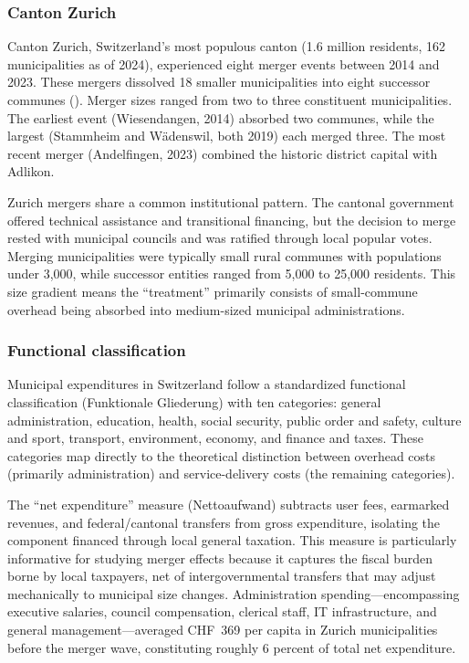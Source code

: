 \documentclass[12pt]{article}
\begin{document}
\subsubsection*{Canton Zurich} Canton Zurich, Switzerland's most populous canton (1.6 million residents, 162 municipalities as of 2024), experienced eight merger events between 2014 and 2023. These mergers dissolved 18 smaller municipalities into eight successor communes (). Merger sizes ranged from two to three constituent municipalities. The earliest event (Wiesendangen, 2014) absorbed two communes, while the largest (Stammheim and Wädenswil, both 2019) each merged three. The most recent merger (Andelfingen, 2023) combined the historic district capital with Adlikon.

Zurich mergers share a common institutional pattern. The cantonal government offered technical assistance and transitional financing, but the decision to merge rested with municipal councils and was ratified through local popular votes. Merging municipalities were typically small rural communes with populations under 3,000, while successor entities ranged from 5,000 to 25,000 residents. This size gradient means the ``treatment'' primarily consists of small-commune overhead being absorbed into medium-sized municipal administrations.

\subsubsection*{Functional classification} Municipal expenditures in Switzerland follow a standardized functional classification (Funktionale Gliederung) with ten categories: general administration, education, health, social security, public order and safety, culture and sport, transport, environment, economy, and finance and taxes. These categories map directly to the theoretical distinction between overhead costs (primarily administration) and service-delivery costs (the remaining categories).

The ``net expenditure'' measure (Nettoaufwand) subtracts user fees, earmarked revenues, and federal/cantonal transfers from gross expenditure, isolating the component financed through local general taxation. This measure is particularly informative for studying merger effects because it captures the fiscal burden borne by local taxpayers, net of intergovernmental transfers that may adjust mechanically to municipal size changes. Administration spending---encompassing executive salaries, council compensation, clerical staff, IT infrastructure, and general management---averaged CHF~369 per capita in Zurich municipalities before the merger wave, constituting roughly 6 percent of total net expenditure.
\end{document}
